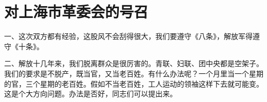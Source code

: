 \section[对上海市革委会的号召（一九六七年五月）]{对上海市革委会的号召}


一、这次双方都有经验，这股风不会刮得很大，我们要遵守《八条》，解放军得遵守《十条》。

二、解放十几年来，我们脱离群众是很厉害的。青联、妇联、团中央都是空架子。我们的要求是不脱产，既当官，又当老百姓。有什么办法呢？一个月里当一个星期的官，三个星期的老百姓。假如不当老百姓，工人运动的领袖这样下去就可能变。这是个大方向问题。办法是否好，同志们可以提出来。

